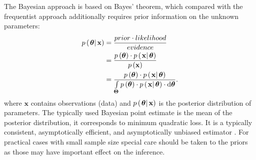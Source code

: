 The Bayesian approach is based on Bayes’ theorem, which compared with the frequentist approach additionally requires prior information on the unknown parameters:
\begin{equation}
\label{eq:bayes_rule}
\begin{split}
	p\left( {\left. {\boldsymbol{\theta }} \right|{\bf{x}}} \right) &= \frac{{prior \cdot likelihood}}{{evidence}} \\
	&= \frac{{p\left( {\boldsymbol{\theta }} \right) \cdot p\left( {\left. {\bf{x}} \right|{\boldsymbol{\theta }}} \right)}}{{p\left( {\bf{x}} \right)}} \\
	&= \frac{{p\left( {\boldsymbol{\theta }} \right) \cdot p\left( {\left. {\bf{x}} \right|{\boldsymbol{\theta }}} \right)}}{{\int\limits_{\boldsymbol{\Theta}}  {p\left( {\boldsymbol{\theta }} \right) \cdot p\left( {\left. {\bf{x}} \right|{\boldsymbol{\theta }}} \right) \cdot \mathrm{d}{\boldsymbol{\theta }}} }}.
\end{split}
\end{equation}
where $\mathbf{x}$ contains observations (data) and $p\left( {\left. {\boldsymbol{\theta }} \right|{\bf{x}}} \right)$ is the posterior distribution of parameters.
The typically used Bayesian point estimate is the mean of the posterior distribution, it corresponds to minimum quadratic loss. It is a typically consistent, asymptotically efficient, and asymptotically unbiased estimator \citep{Gelman2003}. For practical cases with small sample size special care should be taken to the priors as those may have important effect on the inference.



